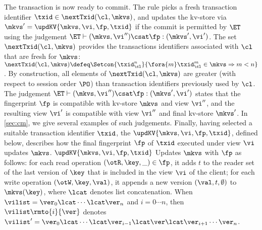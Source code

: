 The transaction is now ready to commit. The rule picks a fresh transaction identifier $\txid \in \nextTxid(\cl, \mkvs)$, 
and updates the kv-store via $\mkvs' = \updKV{\mkvs, \vi, \fp, \txid}$
if the commit is permitted by $\ET$ using the judgement $\ET \vdash (\mkvs, \vi'') \csat \fp : (\mkvs', \vi')$.
The set $\nextTxid(\cl, \mkvs)$ provides the transactions identifiers
associated with $\cl$ that are fresh for  $\mkvs$:
$
\nextTxid(\cl, \mkvs) \defeq \Setcon{\txid_{\cl}^{n}}{\fora{m}
  \txid_{\cl}^{m} \in \mkvs \Rightarrow m < n }
$.
By construction, all elements of $\nextTxid(\cl, \mkvs)$ are greater (with respect to session order $\PO$) 
than transaction identifiers previously used by $\cl$. 
The judgement $\ET \vdash (\mkvs, \vi'') \csat \fp : (\mkvs', \vi')$
states that the fingerprint $\fp$ is compatible with kv-store $\mkvs$
and view $\vi''$, and the resulting view $\vi'$ 
is compatible with view \( \vi'' \) and final kv-store \( \mkvs' \).
In \cref{sec:cm}, we give several examples of such judgements.
Finally, having selected a suitable transaction identifier $\txid$,
the $\updKV{\mkvs, \vi, \fp, \txid}$, defined below, describes how the final fingerprint $\fp$ of $\txid$ executed 
under view $\vi$ updates $\mkvs$.
$\updKV{\mkvs, \vi, \fp, \txid}$ Updates $\mkvs$ with $\fp$ as follows: 
for each read operation $(\otR, \key, \_) \in \fp$, it adds $t$ 
to the reader set of the last version of $\key$ that is included in the view $\vi$ of the client; 
for each write operation $(\otW, \key, \val)$, it appends a new version $(\val, t, \emptyset)$ 
to $\mkvs(\key)$, where $\lcat$ denotes list concatenation.
When $\vilist = \ver_0 \lcat \cdots \lcat \ver_n$ and $i=0 \cdots n$, 
then $\vilist\rmto{i}{\ver}$ denotes 
$\vilist' = \ver_0 \lcat \cdots \lcat \ver_{i-1} \lcat \ver \lcat \ver_{i+1} \cdots \ver_{n}$. 

